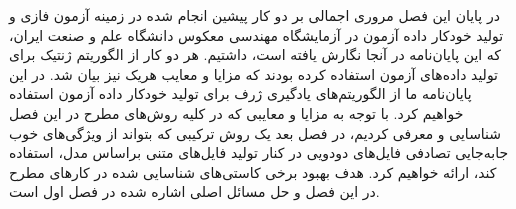 در پایان این فصل مروری اجمالی بر دو کار پیشین انجام شده در زمینه آزمون فازی و تولید خودکار داده آزمون در آزمایشگاه مهندسی معکوس دانشگاه علم و صنعت ایران، که این پایان‌نامه در آنجا نگارش یافته است، داشتیم. هر دو کار 
\cite{amini1395,yaghoubi1392}
از الگوریتم ژنتیک برای تولید داده‌های آزمون استفاده کرده بودند که مزایا و معایب هریک نیز بیان شد. در این پایان‌نامه ما از الگوریتم‌های یادگیری ژرف برای تولید خودکار داده آزمون استفاده خواهیم کرد. با توجه به مزایا و معایبی که در کلیه روش‌های مطرح در این فصل شناسایی و معرفی کردیم، در فصل بعد یک روش ترکیبی که بتواند از ویژگی‌های خوب جابه‌جایی تصادفی فایل‌های دودویی در کنار تولید فایل‌های متنی براساس مدل، استفاده کند، ارائه خواهیم کرد. هدف بهبود برخی کاستی‌های شناسایی شده در کارهای مطرح در این فصل و حل مسائل اصلی اشاره شده در فصل اول است.






 